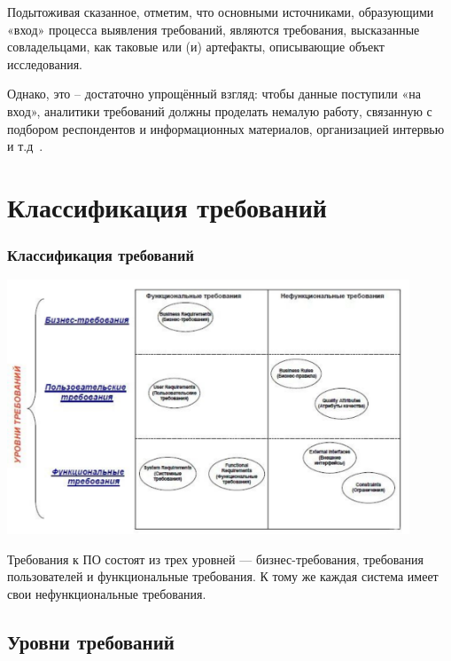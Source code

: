 \documentclass{../industrial-development}
\begin{document}
Подытоживая сказанное, отметим, что основными источниками, образующими «вход» процесса выявления требований, являются требования, высказанные совладельцами, как таковые или (и) артефакты, описывающие объект исследования.

Однако, это – достаточно упрощённый взгляд: чтобы данные поступили «на вход», аналитики требований должны проделать немалую работу, связанную с подбором респондентов и информационных материалов, организацией интервью и т.д~\cite[с.~29--30]{Maglinec}.


\section{Классификация требований}
\begin{frame} \frametitle{Классификация требований}
 \centerline{\includegraphics[width=0.9\textwidth]{pict1.pdf}}
\end{frame}

\lecturenotes

Требования к ПО состоят из трех уровней —
бизнес-требования, требования пользователей и функциональные требования. К тому же каждая система имеет свои нефункциональные требования.


\subsection{Уровни требований}
\end{document}
